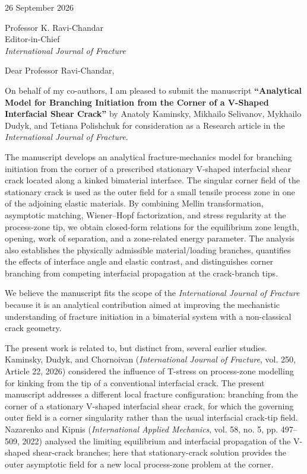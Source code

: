 \documentclass[11pt,a4paper]{article}
\begin{document}
\begin{flushright}
26 September 2026
\end{flushright}

Professor K. Ravi-Chandar\\
Editor-in-Chief\\
\textit{International Journal of Fracture}

Dear Professor Ravi-Chandar,

On behalf of my co-authors, I am pleased to submit the manuscript
\textbf{\textquotedblleft Analytical Model for Branching Initiation from the Corner of a
V-Shaped Interfacial Shear Crack\textquotedblright} by Anatoly Kaminsky, Mikhailo Selivanov,
Mykhailo Dudyk, and Tetiana Polishchuk for consideration as a Research article
in the \textit{International Journal of Fracture}.

The manuscript develops an analytical fracture-mechanics model for branching
initiation from the corner of a prescribed stationary V-shaped interfacial
shear crack located along a kinked bimaterial interface. The singular corner
field of the stationary crack is used as the outer field for a small tensile
process zone in one of the adjoining elastic materials. By combining Mellin
transformation, asymptotic matching, Wiener--Hopf factorization, and stress
regularity at the process-zone tip, we obtain closed-form relations for the
equilibrium zone length, opening, work of separation, and a zone-related
energy parameter. The analysis also establishes the physically admissible
material/loading branches, quantifies the effects of interface angle and
elastic contrast, and distinguishes corner branching from competing
interfacial propagation at the crack-branch tips.

We believe the manuscript fits the scope of the \textit{International Journal
of Fracture} because it is an analytical contribution aimed at improving the
mechanistic understanding of fracture initiation in a bimaterial system with
a non-classical crack geometry.

The present work is related to, but distinct from, several earlier studies.
Kaminsky, Dudyk, and Chornoivan (\textit{International Journal of Fracture}, vol. 250, Article 22, 2026) considered the influence of T-stress on process-zone modelling
for kinking from the tip of a conventional interfacial crack. The present
manuscript addresses a different local fracture configuration: branching from
the corner of a stationary V-shaped interfacial shear crack, for which the
governing outer field is a corner singularity rather than the usual
interfacial crack-tip field. Nazarenko and Kipnis
(\textit{International Applied Mechanics}, vol. 58, no. 5, pp. 497--509, 2022) analysed the limiting
equilibrium and interfacial propagation of the V-shaped shear-crack branches;
here that stationary-crack solution provides the outer asymptotic field for a
new local process-zone problem at the corner.
\end{document}
